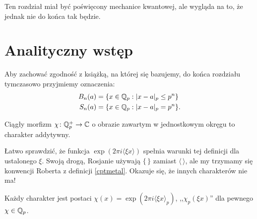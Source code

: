 Ten rozdział miał być poświęcony mechanice kwantowej, ale wygląda na to, że jednak nie do końca tak będzie.

\section{Analityczny wstęp}
Aby zachować zgodność z książką, na której się bazujemy, do końca rozdziału tymczasowo przyjmiemy oznaczenia:
\begin{align*}
B_n(a) & = \{x \in \mathbb Q_p: |x - a|_p \le p^n\} \\
S_n(a) & = \{x \in \mathbb Q_p: |x - a|_p = p^n\}.
\end{align*}

\begin{definicja}
	Ciągły morfizm $\chi \colon \mathbb Q_p^+ \to \mathbb C$ o obrazie zawartym w jednostkowym okręgu to charakter addytywny.
\end{definicja}

Łatwo sprawdzić, że funkcja $\exp (2 \pi i \langle\xi x\rangle)$ spełnia warunki tej definicji dla ustalonego $\xi$. 
Swoją drogą, Rosjanie używają $\{\,\}$ zamiast $\langle \,\rangle$, ale my trzymamy się konwencji Roberta z definicji \ref{cptmetal}.
Okazuje się, że innych charakterów nie ma!

\begin{fakt}
	Każdy charakter jest postaci $\chi(x) = \exp(2 \pi i \langle \xi x \rangle_p)$, ,,$\chi_p(\xi x)$'' dla pewnego $\chi \in \mathbb Q_p$.
\end{fakt}

